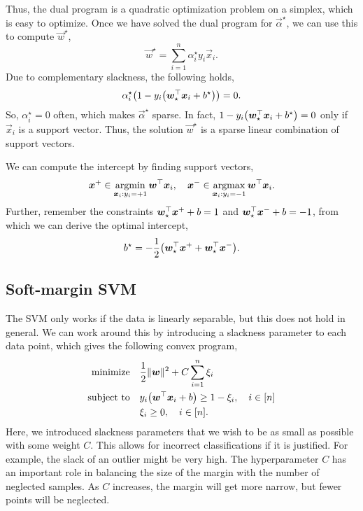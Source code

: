 Thus, the dual program is a quadratic optimization problem on a simplex, which is easy to optimize.
Once we have solved the dual program for $\vec{\alpha}^\star$, we can use this to compute $\vec{w}^\star$, \[
    \vec{w}^\star = \sum_{i=1}^{n} \alpha_i^\star y_i \vec{x}_i.
\]
Due to complementary slackness, the following holds, \[
    \alpha_i^\star \lft( 1 - y_i \lft( \transpose{\vec{w}_\star} \vec{x}_i + b^\star \rgt) \rgt) = 0.
\]
So, $\alpha_i^\star = 0$ often, which makes $\vec{\alpha}^\star$ sparse. In fact, $1 - y_i \lft(
    \transpose{\vec{w}_\star} \vec{x}_i + b^\star \rgt) = 0$ only if $\vec{x}_i$ is a support vector.
Thus, the solution $\vec{w}^\star$ is a sparse linear combination of support vectors.

We can compute the intercept by finding support vectors, \[
    \bm{x}^+ \in \operatorname*{argmin}_{\bm{x}_i : y_i = +1} \bm{w}^\top \bm{x}_i, \quad \bm{x}^- \in \operatorname*{argmax}_{\bm{x}_i : y_i = -1} \bm{w}^\top \bm{x}_i.
\]
Further, remember the constraints $\bm{w}_\star^\top \bm{x}^+ + b = 1$ and
$\bm{w}_\star^\top \bm{x}^- + b = -1$, from which we can derive the optimal intercept, \[
    b^\star = -\frac{1}{2} \lft( \transpose{\vec{w}_\star} \vec{x}^+ + \transpose{\vec{w}_\star} \vec{x}^- \rgt).
\]

\subsection{Soft-margin SVM}

The SVM only works if the data is linearly separable, but this does not hold in general. We can
work around this by introducing a slackness parameter to each data point, which gives the following
convex program,
\begin{align*}
    \text{minimize}   & \quad \frac{1}{2} \| \vec{w} \|^2 + C \sum_{i=1}^{n} \xi_i                              \\
    \text{subject to} & \quad y_i \lft( \transpose{\vec{w}} \vec{x}_i + b \rgt) \geq 1 - \xi_i, \quad i \in [n] \\
                      & \quad \xi_i \geq 0, \quad i \in [n].
\end{align*}
Here, we introduced slackness parameters that we wish to be as small as possible with some weight $C$.
This allows for incorrect classifications if it is justified. For example, the slack of an outlier
might be very high. The hyperparameter $C$ has an important role in balancing the size of the margin
with the number of neglected samples. As $C$ increases, the margin will get more narrow, but fewer points
will be neglected.


